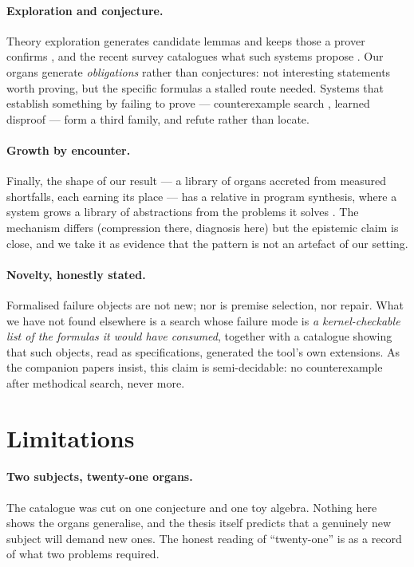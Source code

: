 \documentclass[11pt]{article}
\theoremstyle{remark}\newtheorem{remark}{Remark}
\begin{document}
\paragraph{Exploration and conjecture.} Theory exploration generates candidate lemmas and
keeps those a prover confirms \cite{johansson2014hipster}, and the recent survey
catalogues what such systems propose \cite{conjecturingsurvey2026}. Our organs generate
\emph{obligations} rather than conjectures: not interesting statements worth proving, but
the specific formulas a stalled route needed. Systems that establish something by failing
to prove --- counterexample search \cite{blanchette2011nitpick}, learned disproof
\cite{learningtodisprove2026} --- form a third family, and refute rather than locate.

\paragraph{Growth by encounter.} Finally, the shape of our result --- a library of organs
accreted from measured shortfalls, each earning its place --- has a relative in program
synthesis, where a system grows a library of abstractions from the problems it solves
\cite{ellis2021dreamcoder}. The mechanism differs (compression there, diagnosis here) but
the epistemic claim is close, and we take it as evidence that the pattern is not an
artefact of our setting.

\paragraph{Novelty, honestly stated.} Formalised failure objects are not new; nor is
premise selection, nor repair. What we have not found elsewhere is a search whose failure
mode is \emph{a kernel-checkable list of the formulas it would have consumed}, together
with a catalogue showing that such objects, read as specifications, generated the tool's
own extensions. As the companion papers insist, this claim is semi-decidable: no
counterexample after methodical search, never more.

\section{Limitations}
\label{sec:limitations}

\paragraph{Two subjects, twenty-one organs.} The catalogue was cut on one conjecture and
one toy algebra. Nothing here shows the organs generalise, and the thesis itself predicts
that a genuinely new subject will demand new ones. The honest reading of ``twenty-one'' is
as a record of what two problems required.
\end{document}
